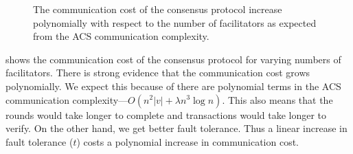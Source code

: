 \begin{figure}[tb]
  \centering
  \caption{The communication cost of the consensus protocol increase polynomially with respect to the number of facilitators as expected from the ACS communication complexity.}
  \label{fig:facilitators-comms}
\end{figure}

 shows the communication cost of the consensus protocol for varying numbers of facilitators.
There is strong evidence that the communication cost grows polynomially.
We expect this because of there are polynomial terms in the ACS communication complexity---$O(n^2|v| + \lambda n^3 \log n)$.
This also means that the rounds would take longer to complete and transactions would take longer to verify.
On the other hand, we get better fault tolerance.
Thus a linear increase in fault tolerance ($t$) costs a polynomial increase in communication cost.
